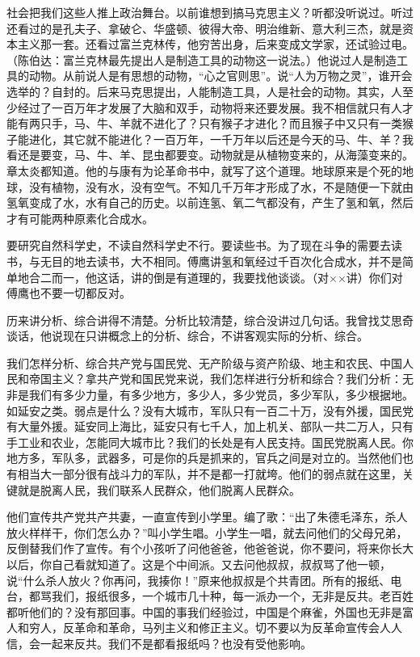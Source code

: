 社会把我们这些人推上政治舞台。以前谁想到搞马克思主义？听都没听说过。听过还看过的是孔夫子、拿破仑、华盛顿、彼得大帝、明治维新、意大利三杰，就是资本主义那一套。还看过富兰克林传，他穷苦出身，后来变成文学家，还试验过电。（陈伯达：富兰克林最先提出人是制造工具的动物这一说法。）他说过人是制造工具的动物。从前说人是有思想的动物，“心之官则思”。说“人为万物之灵”，谁开会选举的？自封的。后来马克思提出，人能制造工具，人是社会的动物。其实，人至少经过了一百万年才发展了大脑和双手，动物将来还要发展。我不相信就只有人才能有两只手，马、牛、羊就不进化了？只有猴子才进化？而且猴子中又只有一类猴子能进化，其它就不能进化？一百万年，一千万年以后还是今天的马、牛、羊？我看还是要变，马、牛、羊、昆虫都要变。动物就是从植物变来的，从海藻变来的。章太炎都知道。他的与康有为论革命书中，就写了这个道理。地球原来是个死的地球，没有植物，没有水，没有空气。不知几千万年才形成了水，不是随便一下就由氢氧变成了水，水有自己的历史。以前连氢、氧二气都没有，产生了氢和氧，然后才有可能两种原素化合成水。

要研究自然科学史，不读自然科学史不行。要读些书。为了现在斗争的需要去读书，与无目的地去读书，大不相同。傅鹰讲氢和氧经过千百次化合成水，并不是简单地合二而一，他这话，讲的倒是有道理的，我要找他谈谈。（对××讲）你们对傅鹰也不要一切都反对。

历来讲分析、综合讲得不清楚。分析比较清楚，综合没讲过几句话。我曾找艾思奇谈话，他说现在只讲概念上的分析、综合，不讲客观实际的分析、综合。

我们怎样分析、综合共产党与国民党、无产阶级与资产阶级、地主和农民、中国人民和帝国主义？拿共产党和国民党来说，我们怎样进行分析和综合？我们分析：无非是我们有多少力量，有多少地方，多少人，多少党员，多少军队，多少根据地。如延安之类。弱点是什么？没有大城市，军队只有一百二十万，没有外援，国民党有大量外援。延安同上海比，延安只有七千人，加上机关、部队一共二万人，只有手工业和农业，怎能同大城市比？我们的长处是有人民支持。国民党脱离人民。你地方多，军队多，武器多，可是你的兵是抓来的，官兵之间是对立的。当然他们也有相当大一部分很有战斗力的军队，并不是都一打就垮。他们的弱点就在这里，关键就是脱离人民，我们联系人民群众，他们脱离人民群众。

他们宣传共产党共产共妻，一直宣传到小学里。编了歌：“出了朱德毛泽东，杀人放火样样干，你们怎么办？”叫小学生唱。小学生一唱，就去问他们的父母兄弟，反倒替我们作了宣传。有个小孩听了问他爸爸，他爸爸说，你不要问，将来你长大以后，你自己看就知道了。这是个中间派。又去问他叔叔，叔叔骂了他一顿，说“什么杀人放火？你再问，我揍你！”原来他叔叔是个共青团。所有的报纸、电台，都骂我们，报纸很多，一个城市几十种，每一派办一个，无非是反共。老百姓都听他们的？没有那回事。中国的事我们经验过，中国是个麻雀，外国也无非是富人和穷人，反革命和革命，马列主义和修正主义。切不要以为反革命宣传会人人信，会一起来反共。我们不是都看报纸吗？也没有受他影响。

